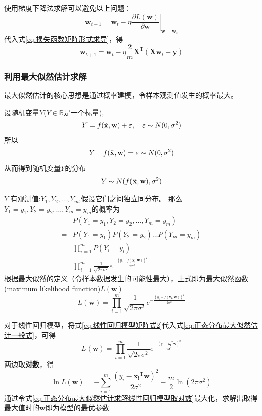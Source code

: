 \documentclass[withoutpreface,bwprint]{NoteBook}
\begin{document}
使用梯度下降法求解可以避免以上问题：
\begin{equation}
    \mathbf{w}_{t+1} = \mathbf{w}_{t} - \eta \left. \frac{\partial L\left ( \mathbf{w} \right )}{\partial \mathbf{w}} \right|_{\mathbf{w}=\mathbf{w}_t}
\end{equation}
代入式\cref{eq:损失函数矩阵形式求导}，得
\begin{equation}
    \mathbf{w}_{t+1} = \mathbf{w}_{t} - \eta \frac{2}{m} \mathbf{X}^\mathrm{T}  \left (\mathbf{X} \mathbf{w}_{t} -\mathbf{y} \right )
\end{equation}

\subsubsection{利用最大似然估计求解}
最大似然估计的核心思想是通过概率建模，令样本观测值发生的概率最大。

设随机变量$Y$($Y \in \mathbb{R}$是一个标量),
$$
Y= f(\tilde{\mathbf{x}},\mathbf{w}) + \varepsilon, \quad \varepsilon \thicksim N(0,\sigma ^2)
$$
所以
$$
Y- f(\tilde{\mathbf{x}},\mathbf{w}) = \varepsilon \thicksim N(0,\sigma ^2)
$$
从而得到随机变量$Y$的分布
\begin{equation}
    Y \thicksim N(f(\tilde{\mathbf{x}},\mathbf{w}),\sigma ^2)
\end{equation}

$Y$ 有观测值:$Y_1, Y_2, \dots, Y_m$,假设它们之间独立同分布。
那么$Y_1=y_1, Y_2=y_2, \dots, Y_m=y_m$的概率为
\begin{align}
      & P(Y_1=y_1, Y_2=y_2, \dots, Y_m=y_m) \nonumber \\
    = & P(Y_1=y_1)P(Y_2=y_2) \dots P(Y_m=y_m) \nonumber \\
    = & \prod_{i=1}^{m} P(Y_i=y_i) \nonumber\\
    = & \prod_{i=1}^{m} \frac{1}{\sqrt{2\pi\sigma^2}}e^{-\frac{(y_i-f(\mathbf{x_i},\mathbf{w}))^2}{2\sigma^2}} 
\end{align} 
根据最大似然的定义（令样本数据发生的可能性最大），上式即为最大似然函数(maximum likelihood function)$L(\mathbf{w})$
\begin{equation}
    \label{eq:正态分布最大似然估计一般式}
    L(\mathbf{w}) = \prod_{i=1}^{m} \frac{1}{\sqrt{2\pi\sigma^2}}e^{-\frac{(y_i-f(\mathbf{x_i},\mathbf{w}))^2}{2\sigma^2}} 
\end{equation}

对于线性回归模型，将式\cref{eq:线性回归模型矩阵式2}代入式\cref{eq:正态分布最大似然估计一般式}，可得
\begin{equation}
    \label{eq:正态分布最大似然估计求解线性回归模型}
    L(\mathbf{w})
    = \prod_{i=1}^{m} \frac{1}{\sqrt{2\pi\sigma^2}}e^{-\frac{(y_i- \mathbf{x_i}^\mathrm{T} \mathbf{w})^2}{2\sigma^2}} 
\end{equation} 
两边取\textbf{对数}，得
\begin{equation}
    \label{eq:正态分布最大似然估计求解线性回归模型取对数}
      \ln{L(\mathbf{w})}
    = -\sum_{i=1}^{m} \frac{(y_i- \mathbf{x_i}^\mathrm{T} \mathbf{w})^2}{2\sigma^2}-\frac{m}{2} \ln{(2\pi\sigma^2)}
\end{equation} 
通过令式\cref{eq:正态分布最大似然估计求解线性回归模型取对数}最大化，求解出取得最大值时的$\mathbf{w}$即为模型的最优参数
\end{document}
